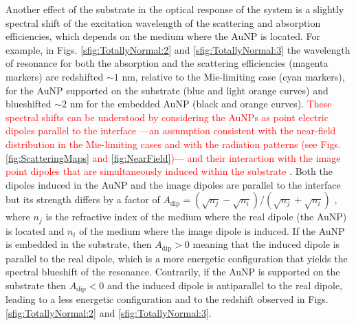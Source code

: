 Another effect of the substrate in the optical response of the system is a slightly spectral shift of the excitation wavelength of the scattering and absorption efficiencies, which depends on the medium where the AuNP is located. For example, in Figs. \ref{sfig:TotallyNormal:2} and \ref{sfig:TotallyNormal:3} the wavelength of resonance for both the absorption and the scattering efficiencies (magenta markers)  are redshifted $\sim 1$ nm, relative to the Mie-limiting case (cyan markers), for the AuNP supported on the substrate (blue and light orange curves) and blueshifted $\sim 2$ nm for the embedded AuNP (black and orange curves). \textcolor{red}{These spectral shifts can be understood by considering the AuNPs as point electric dipoles parallel to the interface ---an assumption consistent with the near-field distribution in the Mie-limiting cases and with the radiation patterns (see Figs.  \ref{fig:ScatteringMaps} and \ref{fig:NearField})--- and their interaction with the image point dipoles that are simultaneously induced within the substrate \cite{meng_anisotropic_2015}}. Both the dipoles induced in the AuNP and the image dipoles are parallel to the interface but its strength differs by  a factor of $A_\text{dip} = (\sqrt{n_j}-\sqrt{n_i}) / (\sqrt{n_j}+\sqrt{n_i})$ \cite{barrera1991optical}, where $n_{j}$ is the refractive index of the medium where the real dipole (the AuNP) is located and $n_i$ of the medium where the image dipole is induced. If the AuNP is embedded in the substrate, then $A_\text{dip}>0$ meaning that the induced dipole is parallel to the real dipole, which is a more energetic configuration that yields the spectral blueshift of the resonance. Contrarily, if the AuNP is supported on the substrate then $A_\text{dip}<0$ and the induced dipole is antiparallel to the real dipole, leading to a less energetic configuration and to the redshift observed in Figs. \ref{sfig:TotallyNormal:2} and \ref{sfig:TotallyNormal:3}.%

